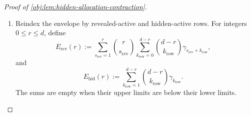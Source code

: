 \documentclass[11pt]{article}
\begin{document}
\begin{proof}[Proof of \cref{obj:lem:hidden-allocation-contraction}]
\begin{enumerate}
Summing over \(k=0,\ldots,M\) covers each admissible degree vector exactly once. The remaining restrictions are rowwise, so the sum factors:
\[
\begin{aligned}
&\sum_{k=0}^M
\frac{\|\mathcal C_{J,k,\mathcal E}\|_{\mathrm{resp}}^2}{\binom Mk}
\\
&\quad\le
\rho_{\nu_{\mathrm{rev}},\nu_{\mathrm{hid}}}^{\nu_{\mathrm{hid}}}
\prod_{\ell\in\mathcal B_J}
\left(
\sum_{k_\ell=0}^{u_\ell}
\binom{u_\ell}{k_\ell}\gamma_{r_{J,\ell}+k_\ell}
\right)
\prod_{\ell\in\mathcal E}
\left(
\sum_{k_\ell=1}^{u_\ell}
\binom{u_\ell}{k_\ell}\gamma_{k_\ell}
\right).
\end{aligned}
\]
Define the active-support envelope by
\[
\begin{aligned}
\mathcal A_H
:=
\sum_{J\subseteq\bigcup_\ell R_\ell}
\sum_{\mathcal E\subseteq\{1,\ldots,B\}\setminus\mathcal B_J}
&\rho_{|\mathcal B_J|,|\mathcal E|}^{|\mathcal E|}
\prod_{\ell\in\mathcal B_J}
\left(
\sum_{k_\ell=0}^{u_\ell}
\binom{u_\ell}{k_\ell}\gamma_{r_{J,\ell}+k_\ell}
\right)
\\[-2pt]
&{}\times
\prod_{\ell\in\mathcal E}
\left(
\sum_{k_\ell=1}^{u_\ell}
\binom{u_\ell}{k_\ell}\gamma_{k_\ell}
\right).
\end{aligned}
\]
Restoring the coefficient \((J,k)=(\varnothing,0)\) adds exactly one to the labeled energy. The support decomposition and the last bound therefore give
\[
\chi_H^2+1\le\mathcal A_H,
\qquad
\chi_H^2\le\mathcal A_H-1
\quad\text{when }M\ge Bd/4.
\]
If \(M<Bd/4\), multiplying either quantity by the remaining-capacity indicator gives zero. This includes \(M=0\).

\item Reindex the envelope by revealed-active and hidden-active rows. For integers \(0\le r\le d\), define
\[
E_{\mathrm{rev}}(r)
:=
\sum_{s_{\mathrm{rev}}=1}^{r}
\binom r{s_{\mathrm{rev}}}
\sum_{k_{\mathrm{row}}=0}^{d-r}
\binom{d-r}{k_{\mathrm{row}}}
\gamma_{s_{\mathrm{rev}}+k_{\mathrm{row}}},
\]
and
\[
E_{\mathrm{hid}}(r)
:=
\sum_{k_{\mathrm{row}}=1}^{d-r}
\binom{d-r}{k_{\mathrm{row}}}\gamma_{k_{\mathrm{row}}}.
\]
The sums are empty when their upper limits are below their lower limits.


\end{enumerate}
\end{proof}
\end{document}
